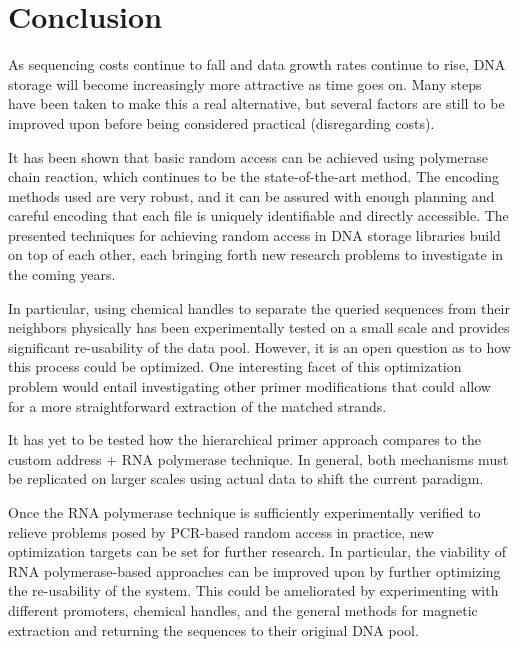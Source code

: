 \documentclass[a4paper,conference]{IEEEtran}
\begin{document}

\section{Conclusion}
As sequencing costs continue to fall and data growth rates continue to rise, DNA storage will become increasingly more attractive as time goes on. Many steps have been taken to make this a real alternative, but several factors are still to be improved upon before being considered practical (disregarding costs).

It has been shown that basic random access can be achieved using polymerase chain reaction, which continues to be the state-of-the-art method. The encoding methods used are very robust, and it can be assured with enough planning and careful encoding that each file is uniquely identifiable and directly accessible. The presented techniques for achieving random access in DNA storage libraries build on top of each other, each bringing forth new research problems to investigate in the coming years.

In particular, using chemical handles to separate the queried sequences from their neighbors physically has been experimentally tested on a small scale and provides significant re-usability of the data pool. However, it is an open question as to how this process could be optimized. One interesting facet of this optimization problem would entail investigating other primer modifications that could allow for a more straightforward extraction of the matched strands.

It has yet to be tested how the hierarchical primer approach compares to the custom address + RNA polymerase technique. In general, both mechanisms must be replicated on larger scales using actual data to shift the current paradigm.

Once the RNA polymerase technique is sufficiently experimentally verified to relieve problems posed by PCR-based random access in practice, new optimization targets can be set for further research. In particular, the viability of RNA polymerase-based approaches can be improved upon by further optimizing the re-usability of the system. This could be ameliorated by experimenting with different promoters, chemical handles, and the general methods for magnetic extraction and returning the sequences to their original DNA pool. 
\end{document}
